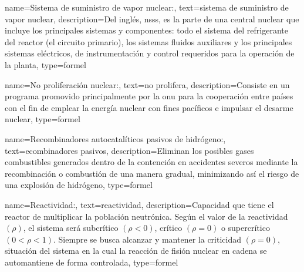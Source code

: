 {
    name=Sistema de suministro de vapor nuclear:,
    text={sistema de suministro de vapor nuclear},
    description={Del inglés, \acrshort{nsss}, es la parte de una central nuclear que incluye los principales sistemas y componentes: todo el sistema del refrigerante del reactor (el circuito primario), los sistemas fluidos auxiliares y los principales sistemas eléctricos, de instrumentación y control requeridos para la operación de la planta},
    type=formel
}

{
    name=No proliferación nuclear:,
    text={no prolifera},
    description={Consiste en un programa promovido principalmente por la \acrshort{onu} para la cooperación entre países con el fin de emplear la energía nuclear con fines pacíficos e impulsar el desarme nuclear},
    type=formel
}

{
    name=Recombinadores autocatalíticos pasivos de hidrógeno:,
    text={ecombinadores pasivos},
    description={Eliminan los posibles gases combustibles generados dentro de la contención en accidentes severos mediante la recombinación o combustión de una manera gradual, minimizando así el riesgo de una explosión de hidrógeno},
    type=formel
}

{
    name=Reactividad:,
    text={reactividad},
    description={Capacidad que tiene el reactor de multiplicar la población neutrónica. Según el valor de la reactividad $(\rho)$, el sistema será subcrítico $(\rho<0)$, crítico $(\rho=0)$ o supercrítico $(0<\rho<1)$. Siempre se busca alcanzar y mantener la criticidad $(\rho=0)$, situación del sistema en la cual la reacción de fisión nuclear en cadena se automantiene de forma controlada},
    type=formel
}


